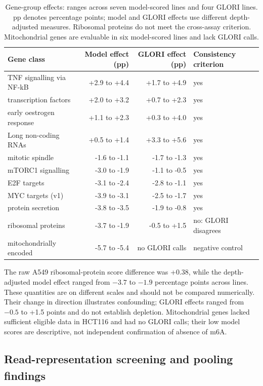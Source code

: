\documentclass[11pt,a4paper]{article}
\makeatletter
\newcounter{appmarknum}
\DeclareRobustCommand{\appmark}[1]{%
    \refstepcounter{appmarknum}\label{appmark@#1}%
    \textsuperscript{\arabic{appmarknum}}}
\makeatother
\begin{document}
\begin{table}[H]
\centering\footnotesize\setlength{\tabcolsep}{3pt}
\begin{tabular}{lrrl}
\toprule
Gene class & Model effect (pp) & GLORI effect (pp) & Consistency criterion \\
\midrule
TNF signalling via NF-kB & +2.9 to +4.4 & +1.7 to +4.9 & yes \\
transcription factors & +2.0 to +3.2 & +0.7 to +2.3 & yes \\
early oestrogen response & +1.1 to +2.3 & +0.3 to +4.0 & yes \\
Long non-coding RNAs & +0.5 to +1.4 & +3.3 to +5.6 & yes \\
mitotic spindle & -1.6 to -1.1 & -1.7 to -1.3 & yes \\
mTORC1 signalling & -3.0 to -1.9 & -1.1 to -0.5 & yes \\
E2F targets & -3.1 to -2.4 & -2.8 to -1.1 & yes \\
MYC targets (v1) & -3.9 to -3.1 & -2.5 to -1.7 & yes \\
protein secretion & -3.8 to -3.5 & -1.9 to -0.8 & yes \\
ribosomal proteins & -3.7 to -1.9 & -0.5 to +1.5 & no: GLORI disagrees \\
mitochondrially encoded & -5.7 to -5.4 & no GLORI calls & negative control \\
\bottomrule
\end{tabular}
\caption{Gene-group effects: ranges across seven model-scored lines and four GLORI lines. pp denotes percentage points; model and GLORI effects use different depth-adjusted measures. Ribosomal proteins do not meet the cross-assay criterion. Mitochondrial genes are evaluable in six model-scored lines and lack GLORI calls.}
\label{tab:sgnex-gene-effects}
\end{table}

The raw A549 ribosomal-protein score difference was +0.38, while the
depth-adjusted model effect ranged from $-3.7$ to $-1.9$ percentage points
across lines. These quantities are on different scales and should not be
compared numerically. Their change in direction illustrates confounding;
GLORI effects ranged from $-0.5$ to +1.5 points and do not establish depletion.
Mitochondrial genes lacked sufficient eligible data in HCT116 and had no
GLORI calls; their low model scores are descriptive, not independent
confirmation of absence of m6A.

\subsection*{Read-representation screening and pooling findings\texorpdfstring{\appmark{app:read-findings}}{}}
\label{app:read-findings}
\end{document}
